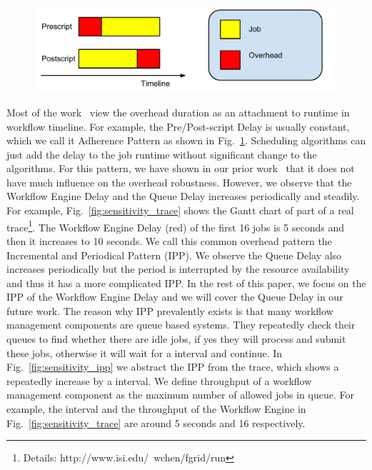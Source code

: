 \begin{figure}[htb]
\centering
 \includegraphics[width=1\linewidth]{figures/sensitivity/adherence.pdf}
  \label{fig:sensitivity_adhere}
\end{figure}

Most of the work~\cite{Dong2010, Yang03} view the overhead duration as an attachment to runtime in workflow timeline. For example, the Pre/Post-script Delay is usually constant, which we call it Adherence Pattern as shown in Fig.~\ref{fig:sensitivity_adhere}. Scheduling algorithms can just add the delay to the job runtime without significant change to the algorithms. For this pattern, we have shown in our prior work~\cite{Chen2012a} that it does not have much influence on the overhead robustness. 
However, we observe that the Workflow Engine Delay and the Queue Delay increases periodically and steadily. For example, Fig.~\ref{fig:sensitivity_trace} shows the Gantt chart of part of a real trace\footnote{Details: http://www.isi.edu/\string~wchen/fgrid/run}. 
The Workflow Engine Delay (red) of the first 16 jobs is 5 seconds and then it increases to 10 seconds. 
We call this common overhead pattern the Incremental and Periodical Pattern (IPP). We observe the Queue Delay also increases periodically but the period is interrupted by the resource availability and thus it has a more complicated IPP. In the rest of this paper, we focus on the IPP of the Workflow Engine Delay and we will cover the Queue Delay in our future work. 
The reason why IPP prevalently exists is that many workflow management components are queue based systems. They repeatedly check their queues to find whether there are idle jobs, if yes they will process and submit these jobs, otherwise it will wait for a interval and continue. In Fig.~\ref{fig:sensitivity_ipp} we abstract the IPP from the trace, which shows a repeatedly increase by a interval. We define throughput of a workflow management component as the maximum number of allowed jobs in queue. For example, the interval and the throughput of the Workflow Engine in Fig.~\ref{fig:sensitivity_trace} are around 5 seconds and 16 respectively. 


